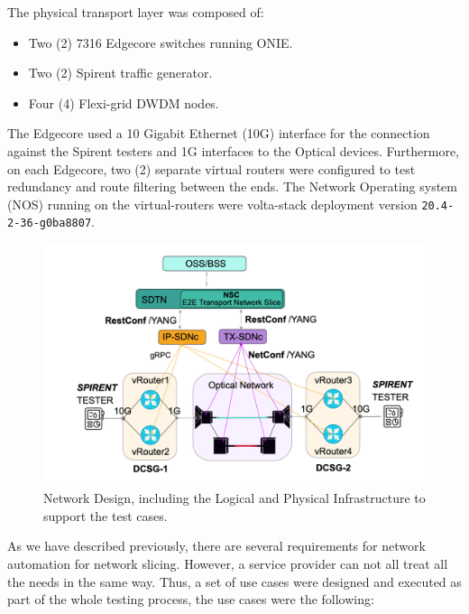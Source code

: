 \documentclass[journal,article,submit,moreauthors,pdftex]{Definitions/mdpi}
\begin{document}
The physical transport layer was composed of:

\begin{itemize}
    \item Two (2) 7316 Edgecore switches running ONIE.
    \item Two (2) Spirent traffic generator.
    \item Four (4) Flexi-grid DWDM nodes.
\end{itemize}

The  Edgecore used a 10 Gigabit Ethernet (10G) interface for the connection against the Spirent testers and 1G interfaces to the Optical devices. Furthermore, on each Edgecore, two (2) separate virtual routers were configured to test redundancy and route filtering between the ends. The Network Operating system (NOS) running on the virtual-routers were volta-stack deployment version \texttt{20.4-2-36-g0ba8807}. 

\begin{figure}[tb]%
\includegraphics[width=\linewidth]{Figs/diagram-6.png}
\caption{Network Design, including the Logical and Physical Infrastructure to support the test cases.}
\label{fig:scheme}
\end{figure}

As we have described previously, there are several requirements for network automation for network slicing. However, a service provider can not all treat all the needs in the same way. Thus, a set of use cases were designed and executed as part of the whole testing process, the use cases were the following:
\end{document}
